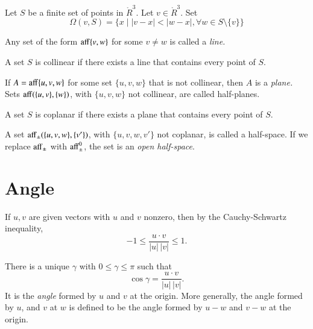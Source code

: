 \begin{definition} 
Let $S$ be a finite set of points in 
$\ring{R}^3$.  Let $v\in\ring{R}^3$. Set
  $$
  \Omega(v,S) = \{x \mid |v-x| < |w-x|, \forall w\in S\setminus\{v\}\}
  $$
\end{definition}
	
\begin{definition}	
Any set of the form ${\operatorname{aff}}\{v,w\}$ for some $v\ne w$ is called a 
 {\it line.}
\end{definition}

\begin{definition}  A set $S$ is collinear if there exists
a line that contains every point of $S$.
\end{definition}

\begin{definition}	
If $A={\operatorname{aff}}\{u,v,w\}$ for some set $\{u,v,w\}$ that is not collinear,
then $A$ is a {\it plane.}  Sets ${\operatorname{aff}}(\{u,v\},\{w\})$, with
$\{u,v,w\}$ not collinear, are called half-planes.
\end{definition}

\begin{definition} A set $S$ is  coplanar if there exists
a plane that contains every point of $S$.
\end{definition}

\begin{definition} A set ${\operatorname{aff}}_{\pm}(\{u,v,w\},\{v'\})$,
with $\{u,v,w,v'\}$ not coplanar, is called a half-space.  If
we replace ${\operatorname{aff}}_{\pm}$ with ${\operatorname{aff}}_{\pm}^0$, the set is an
{\it open half-space}.
\end{definition}

\section{Angle}



If $u,v$ are given vectors with $u$ and $v$ nonzero, then by the
Cauchy-Schwartz inequality,
    $$-1 \le \frac{u\cdot v}{|u|\,|v|} \le 1.$$

\begin{definition}\label{def:angle}
There is a unique $\gamma$ with $0\le\gamma\le\pi$ such that
    $$\cos\gamma = \frac{u\cdot v}{|u|\,|v|}.$$
It is the {\it angle} formed by $u$ and $v$ at the origin. More
generally, the angle formed by $u$, and $v$ at $w$ is defined to be
the angle formed by $u-w$ and $v-w$ at the origin.
\end{definition}

